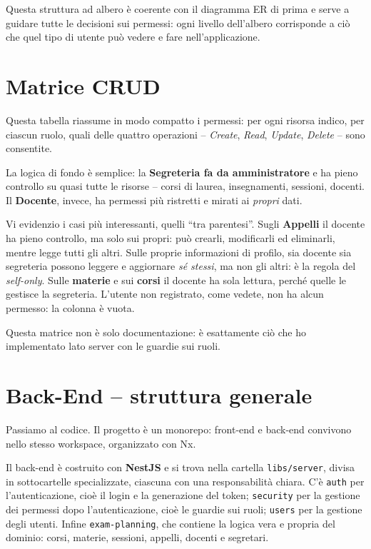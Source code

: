 \documentclass[11pt]{article}
\begin{document}
Questa struttura ad albero è coerente con il diagramma ER di prima e serve a guidare
tutte le decisioni sui permessi: ogni livello dell'albero corrisponde a ciò che quel
tipo di utente può vedere e fare nell'applicazione.

\section*{Matrice CRUD}

Questa tabella riassume in modo compatto i permessi: per ogni risorsa indico, per
ciascun ruolo, quali delle quattro operazioni -- \emph{Create}, \emph{Read},
\emph{Update}, \emph{Delete} -- sono consentite.

La logica di fondo è semplice: la \textbf{Segreteria fa da amministratore} e ha pieno
controllo su quasi tutte le risorse -- corsi di laurea, insegnamenti, sessioni, docenti.
Il \textbf{Docente}, invece, ha permessi più ristretti e mirati ai \emph{propri} dati.

Vi evidenzio i casi più interessanti, quelli ``tra parentesi''. Sugli \textbf{Appelli}
il docente ha pieno controllo, ma solo sui propri: può crearli, modificarli ed
eliminarli, mentre legge tutti gli altri. Sulle proprie informazioni di profilo, sia
docente sia segreteria possono leggere e aggiornare \emph{sé stessi}, ma non gli altri:
è la regola del \emph{self-only}. Sulle \textbf{materie} e sui \textbf{corsi} il docente
ha sola lettura, perché quelle le gestisce la segreteria. L'utente non registrato, come
vedete, non ha alcun permesso: la colonna è vuota.

Questa matrice non è solo documentazione: è esattamente ciò che ho implementato lato
server con le guardie sui ruoli.

\section*{Back-End -- struttura generale}

Passiamo al codice. Il progetto è un monorepo: front-end e back-end convivono nello
stesso workspace, organizzato con Nx.

Il back-end è costruito con \textbf{NestJS} e si trova nella cartella
\texttt{libs/server}, divisa in sottocartelle specializzate, ciascuna con una
responsabilità chiara. C'è \texttt{auth} per l'autenticazione, cioè il login e la
generazione del token; \texttt{security} per la gestione dei permessi dopo
l'autenticazione, cioè le guardie sui ruoli; \texttt{users} per la gestione degli
utenti. Infine \texttt{exam-planning}, che contiene la logica vera e propria del
dominio: corsi, materie, sessioni, appelli, docenti e segretari.
\end{document}
